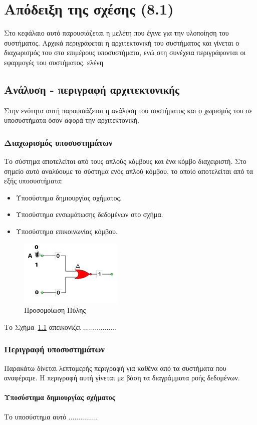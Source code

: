 \chapter{Απόδειξη της σχέσης (8.1)}
Στο κεφάλαιο αυτό παρουσιάζεται η μελέτη που έγινε για την
υλοποίηση του συστήματος. Αρχικά περιγράφεται η αρχιτεκτονική του
συστήματος και γίνεται ο διαχωρισμός του στα επιμέρους
υποσυστήματα, ενώ στη συνέχεια περιγράφονται οι εφαρμογές του
συστήματος. \expandafter\textgreek{ελένη}

\section{Ανάλυση - περιγραφή αρχιτεκτονικής}
Στην ενότητα αυτή παρουσιάζεται η ανάλυση του συστήματος και ο
χωρισμός του σε υποσυστήματα όσον αφορά την αρχιτεκτονική.

\subsection{Διαχωρισμός υποσυστημάτων}
Το σύστημα αποτελείται από τους απλούς κόμβους και ένα κόμβο
διαχειριστή. Στο σημείο αυτό αναλύουμε το σύστημα ενός απλού
κόμβου, το οποίο αποτελείται από τα εξής υποσυστήματα:

\begin{itemize}
\item Υποσύστημα δημιουργίας σχήματος.
\item Υποσύστημα ενσωμάτωσης δεδομένων στο σχήμα.
\item Υποσύστημα επικοινωνίας κόμβου.
\end{itemize}


\begin{figure}[!ht] \centering
\includegraphics{figures/2.png} \caption{Προσομοίωση Πύλης }\label{figureB.1}
\end{figure}

Το Σχήμα~\ref{figureB.1} απεικονίζει .................


\subsection{Περιγραφή υποσυστημάτων}
Παρακάτω δίνεται λεπτομερής περιγραφή για καθένα από τα συστήματα
που αναφέραμε. Η περιγραφή αυτή γίνεται με βάση τα διαγράμματα
ροής δεδομένων.

\subsubsection{Υποσύστημα δημιουργίας σχήματος}
Το υποσύστημα αυτό ...............
